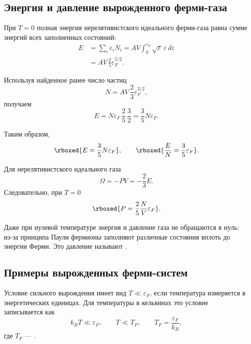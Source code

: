 \documentclass[../final.tex]{subfiles}
\begin{document}
\subsection{Энергия и давление вырожденного ферми-газа}

При $T=0$ полная энергия нерелятивистского идеального ферми-газа
равна сумме энергий всех заполненных состояний:
%
\begin{align*}
    E
    &= \sum_i \varepsilon_i N_i
    = AV\int_0^{\varepsilon_F}
        \sqrt{\varepsilon}\,\varepsilon\,d\varepsilon
    \\[4pt]
    &= AV\,\frac{2}{5}\varepsilon_F^{5/2}.
\end{align*}

Используя найденное ранее число частиц
%
\begin{equation*}
    N = AV\,\frac{2}{3}\varepsilon_F^{3/2},
\end{equation*}
%
получаем
%
\begin{equation*}
    E
    = N\varepsilon_F\,\frac{2}{5}\,\frac{3}{2}
    = \frac{3}{5}N\varepsilon_F.
\end{equation*}

Таким образом,
%
\[
    \rboxed{E = \frac{3}{5}N\varepsilon_F},
    \qquad
    \rboxed{\frac{E}{N} = \frac{3}{5}\varepsilon_F}.
\]

Для нерелятивистского идеального газа
%
\begin{equation*}
    \Omega = -PV = -\frac{2}{3}E.
\end{equation*}
%
Следовательно, при $T=0$
%
\[
    \rboxed{P = \frac{2}{5}\frac{N}{V}\varepsilon_F}.
\]

Даже при нулевой температуре энергия и давление газа не обращаются
в нуль: из-за принципа Паули фермионы заполняют различные состояния
вплоть до энергии Ферми. Это давление называют
.


\subsection{Примеры вырожденных ферми-систем}

Условие сильного вырождения имеет вид $T\ll\varepsilon_F$, если
температура измеряется в энергетических единицах. Для температуры
в кельвинах это условие записывается как
%
\begin{equation*}
    k_B T \ll \varepsilon_F,
    \qquad
    T \ll T_F,
    \qquad
    T_F = \frac{\varepsilon_F}{k_B},
\end{equation*}
%
где $T_F$ --- .
\end{document}
